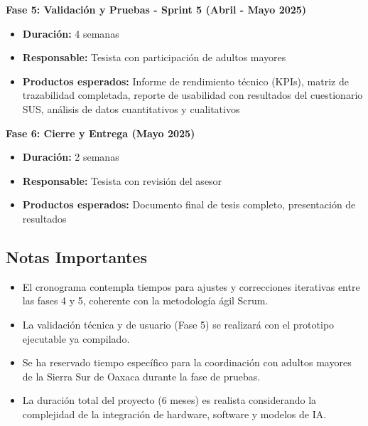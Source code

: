 \textbf{Fase 5: Validación y Pruebas - Sprint 5 (Abril - Mayo 2025)}
\begin{itemize}
    \item \textbf{Duración:} 4 semanas
    \item \textbf{Responsable:} Tesista con participación de adultos mayores
    \item \textbf{Productos esperados:} Informe de rendimiento técnico (KPIs), matriz de trazabilidad completada, reporte de usabilidad con resultados del cuestionario SUS, análisis de datos cuantitativos y cualitativos
\end{itemize}

\textbf{Fase 6: Cierre y Entrega (Mayo 2025)}
\begin{itemize}
    \item \textbf{Duración:} 2 semanas
    \item \textbf{Responsable:} Tesista con revisión del asesor
    \item \textbf{Productos esperados:} Documento final de tesis completo, presentación de resultados
\end{itemize}

\subsection{Notas Importantes}

\begin{itemize}
    \item El cronograma contempla tiempos para ajustes y correcciones iterativas entre las fases 4 y 5, coherente con la metodología ágil Scrum.
    \item La validación técnica y de usuario (Fase 5) se realizará con el prototipo ejecutable ya compilado.
    \item Se ha reservado tiempo específico para la coordinación con adultos mayores de la Sierra Sur de Oaxaca durante la fase de pruebas.
    \item La duración total del proyecto (6 meses) es realista considerando la complejidad de la integración de hardware, software y modelos de IA.
\end{itemize}
